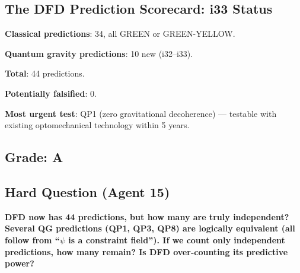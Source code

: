 \documentclass[11pt,a4paper]{article}
\begin{document}
\subsection{The DFD Prediction Scorecard: i33 Status}

\textbf{Classical predictions}: 34, all GREEN or GREEN-YELLOW.

\textbf{Quantum gravity predictions}: 10 new (i32--i33).

\textbf{Total}: 44 predictions.

\textbf{Potentially falsified}: 0.

\textbf{Most urgent test}: QP1 (zero gravitational decoherence) --- testable with existing optomechanical technology within 5 years.

\subsection{Grade: A}

\subsection{Hard Question (Agent 15)}

\textbf{DFD now has 44 predictions, but how many are truly independent? Several QG predictions (QP1, QP3, QP8) are logically equivalent (all follow from ``$\psi$ is a constraint field''). If we count only independent predictions, how many remain? Is DFD over-counting its predictive power?}
\end{document}
